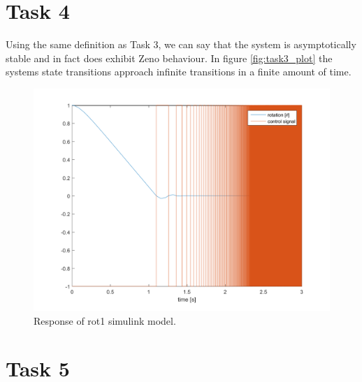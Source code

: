 \documentclass[a4paper,12pt,oneside,onecolumn]{article} %
\begin{document}
\section*{Task 4}
        Using the same definition as Task 3, we can say that the system
        is asymptotically stable and in fact does exhibit Zeno
        behaviour. In figure \ref{fig:task3_plot} the systems state
        transitions approach infinite transitions in a finite amount of
        time. 
	\begin{figure}[H]
        \centering
        \includegraphics[scale = 0.5]{../matlab/images/task4_plot.png}
        \caption{Response of rot1 simulink model.}
        \label{fig:task4_plot}
    \end{figure}

\section*{Task 5}
\end{document}
